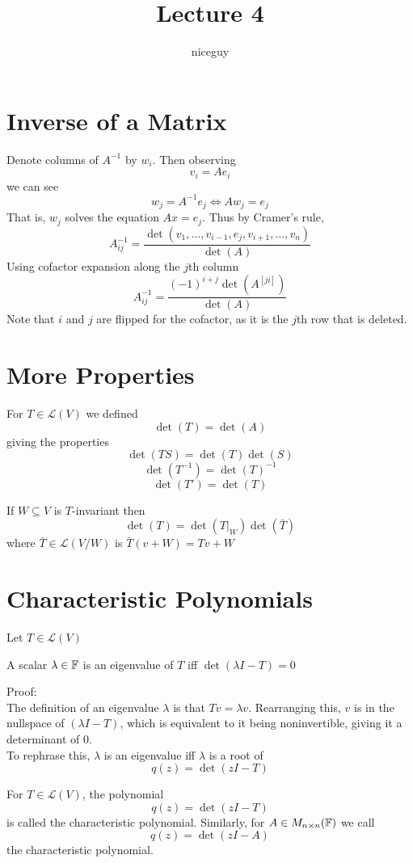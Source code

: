 \documentclass[12pt]{article}
\author{niceguy}
\title{Lecture 4}
\begin{document}
\maketitle

\section{Inverse of a Matrix}

Denote columns of $A^{-1}$ by $w_i$. Then observing
$$v_i = Ae_i$$
we can see
$$w_j = A^{-1}e_j \Leftrightarrow Aw_j = e_j$$
That is, $w_j$ solves the equation $Ax=e_j$. Thus by Cramer's rule,
$$A^{-1}_{ij} = \frac{\det(v_1,\dots,v_{i-1},e_j,v_{i+1},\dots,v_n)}{\det(A)}$$
Using cofactor expansion along the $j$th column
$$A^{-1}_{ij} = \frac{(-1)^{i+j}\det(A^{[ji]})}{\det(A)}$$
Note that $i$ and $j$ are flipped for the cofactor, as it is the $j$th row that is deleted.

\section{More Properties}

For $T\in\mathcal{L}(V)$ we defined
$$\det(T) = \det(A)$$
giving the properties
$$\det(TS) = \det(T)\det(S)$$
$$\det(T^{-1}) = \det(T)^{-1}$$
$$\det(T') = \det(T)$$

If $W\subseteq V$ is $T$-invariant then
$$\det(T) = \det(T|_W)\det(\bar{T})$$
where $\bar{T} \in \mathcal{L}(V/W)$ is $\bar{T}(v+W) = Tv+W$

\section{Characteristic Polynomials}

Let $T\in\mathcal{L}(V)$

\begin{thm}
	A scalar $\lambda\in\mathbb{F}$ is an eigenvalue of $T$ iff $\det(\lambda I-T) = 0$
\end{thm}

Proof: \\
The definition of an eigenvalue $\lambda$ is that $Tv=\lambda v$. Rearranging this, $v$ is in the nullspace of $(\lambda I-T)$, which is equivalent to it being noninvertible, giving it a determinant of 0. \\
To rephrase this, $\lambda$ is an eigenvalue iff $\lambda$ is a root of
$$q(z) = \det(zI - T)$$

\begin{defn}
	For $T\in\mathcal{L}(V)$, the polynomial
	$$q(z) = \det(zI-T)$$
	is called the characteristic polynomial. Similarly, for $A\in M_{n\times n}(\mathbb{F})$ we call
	$$q(z) = \det(zI-A)$$
	the characteristic polynomial.
\end{defn}
\end{document}
